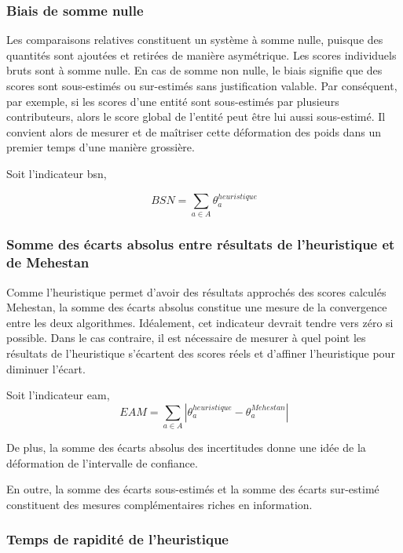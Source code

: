 \subsubsection{Biais de somme nulle}

Les comparaisons relatives constituent un système à somme nulle, puisque des quantités sont ajoutées et retirées de manière asymétrique. Les scores individuels bruts sont à somme nulle. En cas de somme non nulle, le biais signifie que des scores sont sous-estimés ou sur-estimés sans justification valable. Par conséquent, par exemple, si les scores d'une entité sont sous-estimés par plusieurs contributeurs, alors le score global de l'entité peut être lui aussi sous-estimé. Il convient alors de mesurer et de maîtriser cette déformation des poids dans un premier temps d'une manière grossière.

Soit l'indicateur \gls{bsn},

\begin{equation}
BSN= \sum_{a \in A} \theta^{heuristique}_{a}
\end{equation}


\subsubsection{Somme des écarts absolus entre résultats de l'heuristique et de Mehestan}

Comme l'heuristique permet d'avoir des résultats approchés des scores calculés Mehestan, la somme des écarts absolus constitue une mesure de la convergence entre les deux algorithmes. Idéalement, cet indicateur devrait tendre vers zéro si possible. Dans le cas contraire, il est nécessaire de mesurer à quel point les résultats de l'heuristique s'écartent des scores réels et d'affiner l'heuristique pour diminuer l'écart.

Soit l'indicateur \gls{eam},
\begin{equation}
EAM= \sum_{a \in A} \left| \theta^{heuristique}_{a}-\theta^{Mehestan}_{a} \right| 
\end{equation}



De plus, la somme des écarts absolus des incertitudes donne une idée de la déformation de l'intervalle de confiance.


En outre, la somme des écarts sous-estimés et la somme des écarts sur-estimé constituent des mesures complémentaires riches en information.

\subsubsection{Temps de rapidité de l'heuristique}

